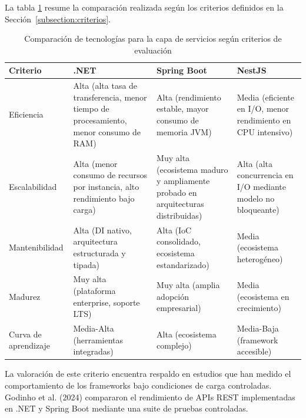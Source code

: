 La tabla \ref{tab:comparacion_backend} resume la comparación realizada según los criterios definidos en la Sección~\ref{subsection:criterios}.

\begin{table}[htbp]
	\centering
	\caption{Comparación de tecnologías para la capa de servicios según criterios de evaluación}
	\label{tab:comparacion_backend}
	\renewcommand{\arraystretch}{1.3}
	\begin{tabular}{|p{3.2cm}|p{3.5cm}|p{3.5cm}|p{3.5cm}|}
	\hline
	\textbf{Criterio} & \textbf{.NET} & \textbf{Spring Boot} & \textbf{NestJS} \\[6pt]
	\hline
		Eficiencia & Alta (alta tasa de transferencia, menor tiempo de procesamiento, menor consumo de RAM) & Alta (rendimiento estable, mayor consumo de memoria JVM) & Media (eficiente en I/O, menor rendimiento en CPU intensivo) \\[6pt] \hline
		Escalabilidad & Alta (menor consumo de recursos por instancia, alto rendimiento bajo carga) & Muy alta (ecosistema maduro y ampliamente probado en arquitecturas distribuidas) & Alta (alta concurrencia en I/O mediante modelo no bloqueante) \\[6pt] \hline
		Mantenibilidad & Alta (DI nativo, arquitectura estructurada y tipada) & Alta (IoC consolidado, ecosistema estandarizado) & Media (ecosistema heterogéneo) \\[6pt] \hline
		Madurez & Muy alta (plataforma enterprise, soporte LTS) & Muy alta (amplia adopción empresarial) & Media (ecosistema en crecimiento) \\[6pt] \hline
		Curva de aprendizaje & Media-Alta (herramientas integradas) & Alta (ecosistema complejo) & Media-Baja (framework accesible) \\[6pt] \hline
	\end{tabular}
\end{table}

La valoración de este criterio encuentra respaldo en estudios que han medido el comportamiento de los frameworks bajo condiciones de carga controladas. 
Godinho et al. (2024) compararon el rendimiento de APIs REST implementadas en .NET y Spring Boot mediante una suite de pruebas controladas. 

